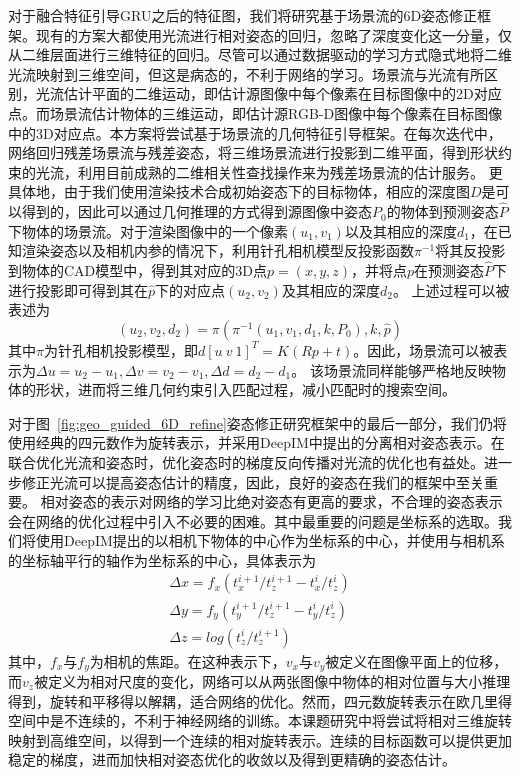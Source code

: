 \documentclass[12pt]{article}
\begin{document}
对于融合特征引导GRU之后的特征图，我们将研究基于场景流的6D姿态修正框架。现有的方案大都使用光流进行相对姿态的回归，忽略了深度变化这一分量，仅从二维层面进行三维特征的回归。尽管可以通过数据驱动的学习方式隐式地将二维光流映射到三维空间，但这是病态的，不利于网络的学习。场景流与光流有所区别，光流估计平面的二维运动，即估计源图像中每个像素在目标图像中的2D对应点。而场景流估计物体的三维运动，即估计源RGB-D图像中每个像素在目标图像中的3D对应点。本方案将尝试基于场景流的几何特征引导框架。在每次迭代中，网络回归残差场景流与残差姿态，将三维场景流进行投影到二维平面，得到形状约束的光流，利用目前成熟的二维相关性查找操作来为残差场景流的估计服务。
更具体地，由于我们使用渲染技术合成初始姿态下的目标物体，相应的深度图$D$是可以得到的，因此可以通过几何推理的方式得到源图像中姿态$P_0$的物体到预测姿态$\hat{P}$下物体的场景流。对于渲染图像中的一个像素$(u_1,v_1)$以及其相应的深度$d_1$，在已知渲染姿态以及相机内参的情况下，利用针孔相机模型反投影函数$\pi^{-1}$将其反投影到物体的CAD模型中，得到其对应的3D点$p=(x,y,z)$，并将点$p$在预测姿态$\hat{P}$下进行投影即可得到其在$\hat{p}$下的对应点$(u_2,v_2)$及其相应的深度$d_2$。
上述过程可以被表述为
\begin{equation}
    (u_2,v_2,d_2) = \pi(\pi^{-1}(u_1, v_1,d_1, k, P_0), k, \hat{p})
\end{equation}
其中$\pi$为针孔相机投影模型，即$d[u~v~1]^T=K(Rp+t)$。因此，场景流可以被表示为$\Delta u = u_2 - u_1, \Delta v = v_2 - v_1, \Delta d = d_2 - d_1$。
该场景流同样能够严格地反映物体的形状，进而将三维几何约束引入匹配过程，减小匹配时的搜索空间。

对于图~\ref{fig:geo_guided_6D_refine}姿态修正研究框架中的最后一部分，我们仍将使用经典的四元数作为旋转表示，并采用DeepIM\cite{li2018deepim}中提出的分离相对姿态表示。在联合优化光流和姿态时，优化姿态时的梯度反向传播对光流的优化也有益处。进一步修正光流可以提高姿态估计的精度，因此，良好的姿态在我们的框架中至关重要。
相对姿态的表示对网络的学习比绝对姿态有更高的要求，不合理的姿态表示会在网络的优化过程中引入不必要的困难。其中最重要的问题是坐标系的选取。我们将使用DeepIM提出的以相机下物体的中心作为坐标系的中心，并使用与相机系的坐标轴平行的轴作为坐标系的中心，具体表示为
\begin{gather}
    \Delta x = f_x(t_x^{i+1}/t_z^{i+1} - t_x^i/t_z^i)\\
    \Delta y = f_y(t_y^{i+1}/t_z^{i+1} - t_y^i/t_z^i) \\
    \Delta z = log(t_z^i/t_z^{i+1})
\end{gather} 
其中，$f_x$与$f_y$为相机的焦距。在这种表示下，$v_x$与$v_y$被定义在图像平面上的位移，而$v_z$被定义为相对尺度的变化，网络可以从两张图像中物体的相对位置与大小推理得到，旋转和平移得以解耦，适合网络的优化。然而，四元数旋转表示在欧几里得空间中是不连续的，不利于神经网络的训练。本课题研究中将尝试将相对三维旋转映射到高维空间，以得到一个连续的相对旋转表示。连续的目标函数可以提供更加稳定的梯度，进而加快相对姿态优化的收敛以及得到更精确的姿态估计。
\end{document}
